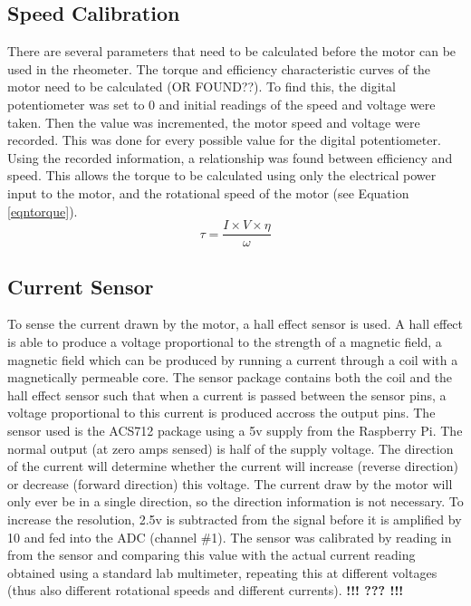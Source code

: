 \documentclass[twoside,a4]{report}
\def\br{\newline \newline \noindent}
\def\cbh{\large\bfseries !!! ??? !!! \normalsize\normalfont}
\begin{document}
	\subsection*{Speed Calibration} %
	There are several parameters that need to be calculated before the motor can be used in the rheometer. The torque and efficiency characteristic curves of the motor need to be calculated (OR FOUND??). To find this, the digital potentiometer was set to 0 and initial readings of the speed and voltage were taken. Then the value was incremented, the motor speed and voltage were recorded. This was done for every possible value for the digital potentiometer. Using the recorded information, a relationship was found between efficiency and speed. This allows the torque to be calculated using only the electrical power input to the motor, and the rotational speed of the motor (see Equation \ref{eqntorque}).
	\begin{equation}
	\tau = \frac{I \times V \times \eta}{\omega}
	\label{eqntorque}
	\end{equation}
	
	\subsection*{Current Sensor}
	To sense the current drawn by the motor, a hall effect sensor is used. A hall effect is able to produce a voltage proportional to the strength of a magnetic field, a magnetic field which can be produced by running a current through a coil with a magnetically permeable core. The sensor package contains both the coil and the hall effect sensor such that when a current is passed between the sensor pins, a voltage proportional to this current is produced accross the output pins. The sensor used is the ACS712 package using a 5v supply from the Raspberry Pi. The normal output (at zero amps sensed) is half of the supply voltage. The direction of the current will determine whether the current will increase (reverse direction) or decrease (forward direction) this voltage. \br
	The current draw by the motor will only ever be in a single direction, so the direction information is not necessary. To increase the resolution, 2.5v is subtracted from the signal before it is amplified by 10 and fed into the ADC (channel \#1). \br
	The sensor was calibrated by reading in from the sensor and comparing this value with the actual current reading obtained using a standard lab multimeter, repeating this at different voltages (thus also different rotational speeds and different currents). \br
	\cbh %
	
\end{document}
